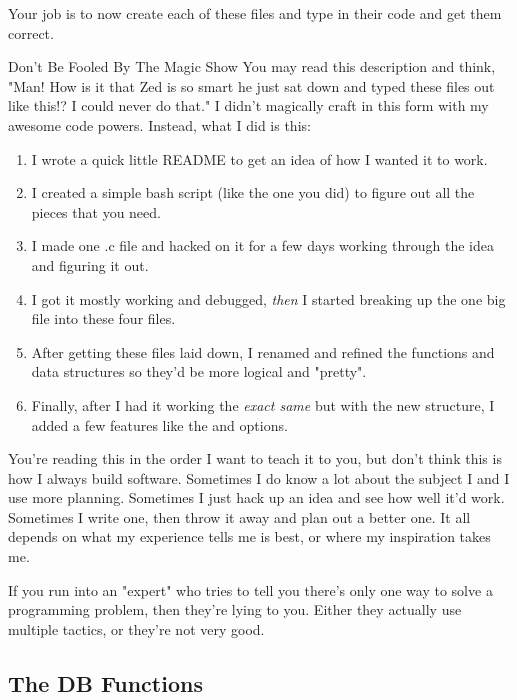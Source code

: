 Your job is to now create each of these files and type in their code
and get them correct.

\begin{aside}{Don't Be Fooled By The Magic Show}
You may read this description and think, "Man! How is it that Zed is
so smart he just sat down and typed these files out like this!? I
could never do that."  I didn't magically craft  
in this form with my awesome code powers.  Instead, what I did is this:

\begin{enumerate}
\item I wrote a quick little README to get an idea of how I wanted it
    to work.
\item I created a simple bash script (like the one you did) to figure
    out all the pieces that you need.
\item I made one .c file and hacked on it for a few days working through
    the idea and figuring it out.
\item I got it mostly working and debugged, \emph{then} I started
    breaking up the one big file into these four files.
\item After getting these files laid down, I renamed and refined the
    functions and data structures so they'd be more logical and "pretty".
\item Finally, after I had it working the \emph{exact same} but with
    the new structure, I added a few features like the  and
     options.
\end{enumerate}

You're reading this in the order I want to teach it to you, but don't think
this is how I always build software.  Sometimes I do know a lot about the
subject I and I use more planning.  Sometimes I just hack up an idea and
see how well it'd work.  Sometimes I write one, then throw it away and
plan out a better one.  It all depends on what my experience tells me is
best, or where my inspiration takes me.

If you run into an "expert" who tries to tell you there's only one
way to solve a programming problem, then they're lying to you.  Either
they actually use multiple tactics, or they're not very good.
\end{aside}

\subsection{The DB Functions}

